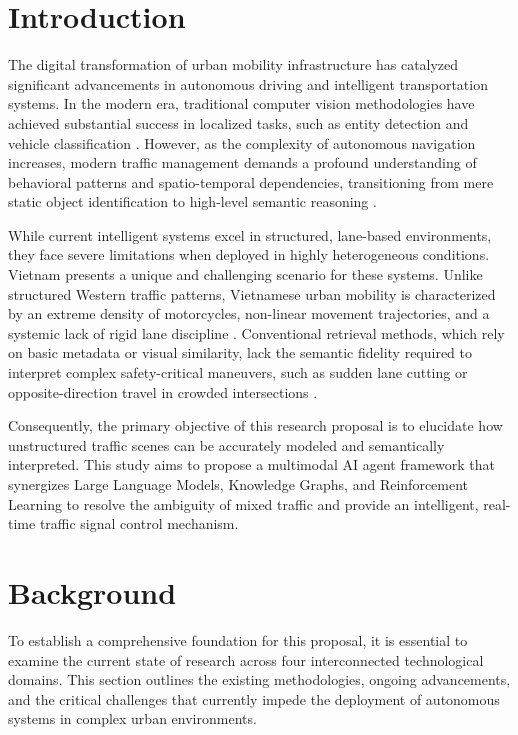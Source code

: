 \documentclass[a4paper, 12pt]{article}
\begin{document}
	\section{Introduction}
	The digital transformation of urban mobility infrastructure has catalyzed significant advancements in autonomous driving and intelligent transportation systems. In the modern era, traditional computer vision methodologies have achieved substantial success in localized tasks, such as entity detection and vehicle classification \cite{nguyen2023object, ji2020action}. However, as the complexity of autonomous navigation increases, modern traffic management demands a profound understanding of behavioral patterns and spatio-temporal dependencies, transitioning from mere static object identification to high-level semantic reasoning \cite{mao2023gpt4, zheng2024llmits}.
	
	While current intelligent systems excel in structured, lane-based environments, they face severe limitations when deployed in highly heterogeneous conditions. Vietnam presents a unique and challenging scenario for these systems. Unlike structured Western traffic patterns, Vietnamese urban mobility is characterized by an extreme density of motorcycles, non-linear movement trajectories, and a systemic lack of rigid lane discipline \cite{ly2025enhancing, vo2021density}. Conventional retrieval methods, which rely on basic metadata or visual similarity, lack the semantic fidelity required to interpret complex safety-critical maneuvers, such as sudden lane cutting or opposite-direction travel in crowded intersections \cite{wang2021interaction, cao2023graphmatching}. 
	
	
	
	Consequently, the primary objective of this research proposal is to elucidate how unstructured traffic scenes can be accurately modeled and semantically interpreted. This study aims to propose a multimodal AI agent framework that synergizes Large Language Models, Knowledge Graphs, and Reinforcement Learning to resolve the ambiguity of mixed traffic and provide an intelligent, real-time traffic signal control mechanism.
	
	\section{Background}
	To establish a comprehensive foundation for this proposal, it is essential to examine the current state of research across four interconnected technological domains. This section outlines the existing methodologies, ongoing advancements, and the critical challenges that currently impede the deployment of autonomous systems in complex urban environments.
\end{document}
